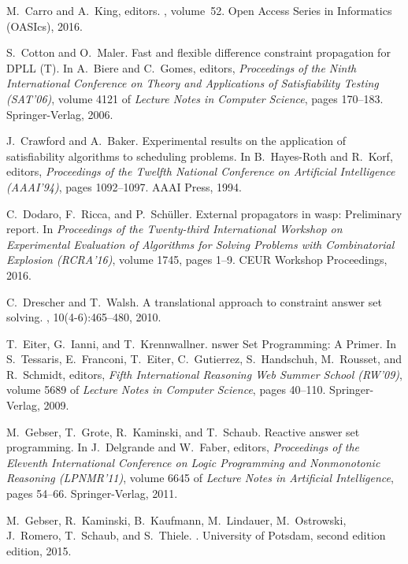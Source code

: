\begin{thebibliography}{10}
M.~Carro and A.~King, editors.
, volume~52. Open Access Series in
  Informatics (OASIcs), 2016.

S.~Cotton and O.~Maler.
\newblock Fast and flexible difference constraint propagation for {DPLL (T)}.
\newblock In A.~Biere and C.~Gomes, editors, {\em Proceedings of the Ninth
  International Conference on Theory and Applications of Satisfiability Testing
  (SAT'06)}, volume 4121 of {\em Lecture Notes in Computer Science}, pages
  170--183. Springer-Verlag, 2006.

J.~Crawford and A.~Baker.
\newblock Experimental results on the application of satisfiability algorithms
  to scheduling problems.
\newblock In B.~Hayes-Roth and R.~Korf, editors, {\em Proceedings of the
  Twelfth National Conference on Artificial Intelligence (AAAI'94)}, pages
  1092--1097. AAAI Press, 1994.

C.~Dodaro, F.~Ricca, and P.~Schüller.
\newblock External propagators in wasp: Preliminary report.
\newblock In {\em Proceedings of the Twenty-third International Workshop on
  Experimental Evaluation of Algorithms for Solving Problems with Combinatorial
  Explosion (RCRA'16)}, volume 1745, pages 1--9. CEUR Workshop Proceedings,
  2016.

C.~Drescher and T.~Walsh.
\newblock A translational approach to constraint answer set solving.
, 10(4-6):465--480,
  2010.

T.~Eiter, G.~Ianni, and T.~Krennwallner.
nswer {S}et {P}rogramming: {A} {P}rimer.
\newblock In S.~Tessaris, E.~Franconi, T.~Eiter, C.~Gutierrez, S.~Handschuh,
  M.~Rousset, and R.~Schmidt, editors, {\em Fifth International Reasoning Web
  Summer School (RW'09)}, volume 5689 of {\em Lecture Notes in Computer
  Science}, pages 40--110. Springer-Verlag, 2009.

M.~Gebser, T.~Grote, R.~Kaminski, and T.~Schaub.
\newblock Reactive answer set programming.
\newblock In J.~Delgrande and W.~Faber, editors, {\em Proceedings of the
  Eleventh International Conference on Logic Programming and Nonmonotonic
  Reasoning (LPNMR'11)}, volume 6645 of {\em Lecture Notes in Artificial
  Intelligence}, pages 54--66. Springer-Verlag, 2011.

M.~Gebser, R.~Kaminski, B.~Kaufmann, M.~Lindauer, M.~Ostrowski, J.~Romero,
  T.~Schaub, and S.~Thiele.
.
\newblock University of Potsdam, second edition edition, 2015.


\end{thebibliography}
